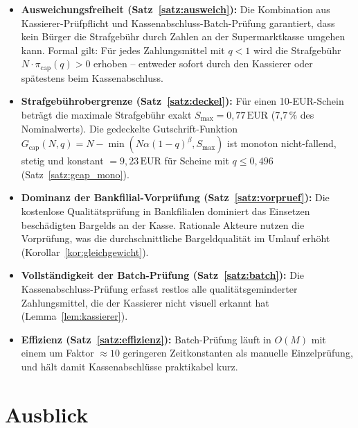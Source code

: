 ﻿\documentclass[a4paper,12pt]{article}
\theoremstyle{definition}
\begin{document}
\begin{itemize}
  \item \textbf{Ausweichungsfreiheit (Satz~\ref{satz:ausweich}):}
        Die Kombination aus Kassierer-Prüfpflicht und Kassenabschluss-Batch-Prüfung
        garantiert, dass kein Bürger die Strafgebühr durch Zahlen an der
        Supermarktkasse umgehen kann.  Formal gilt: Für jedes Zahlungsmittel
        mit $q < 1$ wird die Strafgebühr $N \cdot \pi_{\text{cap}}(q) > 0$ erhoben --
        entweder sofort durch den Kassierer oder spätestens beim Kassenabschluss.
  \item \textbf{Strafgebührobergrenze (Satz~\ref{satz:deckel}):}
        Für einen 10-EUR-Schein beträgt die maximale Strafgebühr exakt
        $S_{\max} = 0{,}77\,\text{EUR}$ (7,7\,\% des Nominalwerts).
        Die gedeckelte Gutschrift-Funktion $G_{\text{cap}}(N,q) = N - \min(N\alpha(1-q)^{\beta}, S_{\max})$
        ist monoton nicht-fallend, stetig und konstant $= 9{,}23\,\text{EUR}$
        für Scheine mit $q \leq 0{,}496$ (Satz~\ref{satz:gcap_mono}).
  \item \textbf{Dominanz der Bankfilial-Vorprüfung (Satz~\ref{satz:vorpruef}):}
        Die kostenlose Qualitätsprüfung in Bankfilialen dominiert das Einsetzen
        beschädigten Bargelds an der Kasse.  Rationale Akteure nutzen die
        Vorprüfung, was die durchschnittliche Bargeldqualität im Umlauf erhöht
        (Korollar~\ref{kor:gleichgewicht}).
  \item \textbf{Vollständigkeit der Batch-Prüfung (Satz~\ref{satz:batch}):}
        Die Kassenabschluss-Prüfung erfasst restlos alle qualitätsgeminderter
        Zahlungsmittel, die der Kassierer nicht visuell erkannt hat
        (Lemma~\ref{lem:kassierer}).
  \item \textbf{Effizienz (Satz~\ref{satz:effizienz}):}
        Batch-Prüfung läuft in $O(M)$ mit einem um Faktor $\approx 10$
        geringeren Zeitkonstanten als manuelle Einzelprüfung,
        und hält damit Kassenabschlüsse praktikabel kurz.
\end{itemize}

\section{Ausblick}
\label{sec:ausblick}
\end{document}
